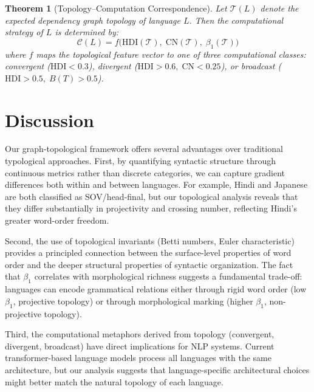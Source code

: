 \documentclass[11pt,a4paper]{article}
\newtheorem{theorem}{Theorem}
\begin{document}
\begin{theorem}[Topology--Computation Correspondence]
  Let $\mathcal{T}(L)$ denote the expected dependency graph topology of
  language $L$. Then the computational strategy of $L$ is determined by:
  \begin{equation}
    \mathcal{C}(L) = f\bigl(\mathrm{HDI}(\mathcal{T}),\;
    \mathrm{CN}(\mathcal{T}),\;
    \beta_1(\mathcal{T})\bigr)
  \end{equation}
  where $f$ maps the topological feature vector to one of three
  computational classes: convergent ($\mathrm{HDI} < 0.3$), divergent
  ($\mathrm{HDI} > 0.6,\; \mathrm{CN} < 0.25$), or broadcast
  ($\mathrm{HDI} > 0.5,\; B(T) > 0.5$).
\end{theorem}

\section{Discussion}
\label{sec:discussion}

Our graph-topological framework offers several advantages over
traditional typological approaches. First, by quantifying syntactic
structure through continuous metrics rather than discrete categories, we
can capture gradient differences both within and between languages. For
example, Hindi and Japanese are both classified as SOV/head-final, but
our topological analysis reveals that they differ substantially in
projectivity and crossing number, reflecting Hindi's greater word-order
freedom.

Second, the use of topological invariants (Betti numbers, Euler
characteristic) provides a principled connection between the
surface-level properties of word order and the deeper structural
properties of syntactic organization. The fact that $\beta_1$ correlates
with morphological richness suggests a fundamental trade-off: languages
can encode grammatical relations either through rigid word order (low
$\beta_1$, projective topology) or through morphological marking
(higher $\beta_1$, non-projective topology).

Third, the computational metaphors derived from topology (convergent,
divergent, broadcast) have direct implications for NLP systems. Current
transformer-based language models process all languages with the same
architecture, but our analysis suggests that language-specific
architectural choices might better match the natural topology of each
language.
\end{document}
